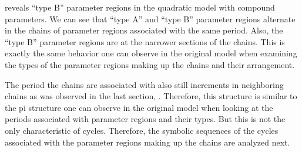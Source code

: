  reveals ``type B'' parameter regions in the quadratic model with compound parameters.
We can see that ``type A'' and ``type B'' parameter regions alternate in the chains of parameter regions associated with the same period.
Also, the ``type B'' parameter regions are at the narrower sections of the chains.
This is exactly the same behavior one can observe in the original model when examining the types of the parameter regions making up the chains and their arrangement.

The period the chains are associated with also still increments in neighboring chains as was observed in the last section, .
Therefore, this structure is similar to the \gls{pi} structure one can observe in the original model when looking at the periods associated with parameter regions and their types.
But this is not the only characteristic of cycles.
Therefore, the symbolic sequences of the cycles associated with the parameter regions making up the chains are analyzed next.

